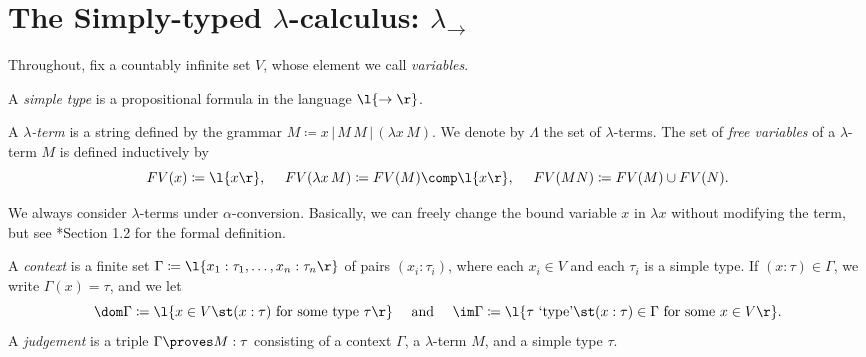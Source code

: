 \documentclass[reqno]{amsart}
\begin{document}
    \section{The Simply-typed $\lambda$-calculus: $\lambda_\rightarrow$}

    Throughout, fix a countably infinite set $V$, whose element we call \textit{variables}.

    \begin{definition}
        A \textit{simple type} is a propositional formula in the language $\l\{\rightarrow\r\}$.
    \end{definition}

    \begin{definition}
        A \textit{$\lambda$-term} is a string defined by the grammar $M\coloneqq x\,|\,M\,M\,|\,(\lambda x\,M)$. We denote by $\Lambda$ the set of $\lambda$-terms. The set of \textit{free variables} of a $\lambda$-term $M$ is defined inductively by
        \begin{equation*}
            FV(x)\coloneqq\l\{x\r\},\ \ \ \ FV(\lambda x\,M)\coloneqq FV(M)\comp\l\{x\r\},\ \ \ \ FV(MN)\coloneqq FV(M)\cup FV(N).
        \end{equation*}
    \end{definition}

    \begin{remark}
        We always consider $\lambda$-terms under $\alpha$-conversion. Basically, we can freely change the bound variable $x$ in $\lambda x$ without modifying the term, but see \cite{SU06}*{Section 1.2} for the formal definition.
    \end{remark}

    \begin{definition}
        A \textit{context} is a finite set $\Gamma\coloneqq\l\{x_1:\tau_1,\dots,x_n:\tau_n\r\}$ of pairs $(x_i:\tau_i)$, where each $x_i\in V$ and each $\tau_i$ is a simple type. If $(x:\tau)\in\Gamma$, we write $\Gamma(x)=\tau$, and we let
        \begin{equation*}
            \dom\Gamma\coloneqq\l\{x\in V\st(x:\tau)\textrm{ for some type }\tau\r\}\ \ \ \ \textrm{and}\ \ \ \ \im\Gamma\coloneqq\l\{\tau\textrm{ `type'}\st(x:\tau)\in\Gamma\textrm{ for some }x\in V\r\}.
        \end{equation*}
        A \textit{judgement} is a triple $\Gamma\proves M:\tau$ consisting of a context $\Gamma$, a $\lambda$-term $M$, and a simple type $\tau$.
    \end{definition}
\end{document}
